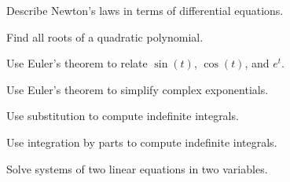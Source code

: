 \begin{readinessAssuranceOutcomes}
\item Describe Newton's laws in terms of differential equations.
\item Find all roots of a quadratic polynomial. 
\item Use Euler's theorem to relate \(\sin(t)\), \(\cos(t)\), and \(e^t\).
\item Use Euler's theorem to simplify complex exponentials.
\item Use substitution to compute indefinite integrals.
\item Use integration by parts to compute indefinite integrals.
\item Solve systems of two linear equations in two variables.
\end{readinessAssuranceOutcomes}
